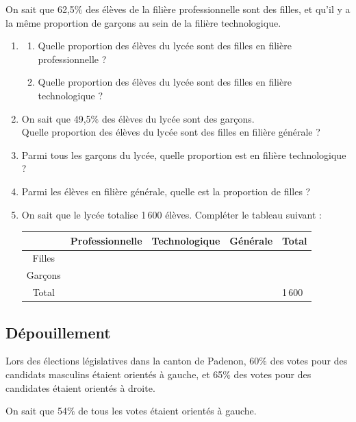 \documentclass[oneside,12pt]{article}          %
\begin{document}
On sait que 62,5$\%$ des élèves de la filière professionnelle sont des filles, et qu'il y a la même proportion de garçons au sein de la filière technologique.
\begin{enumerate}
    \item \begin{enumerate}
        \item Quelle proportion des élèves du lycée sont des filles en filière professionnelle ?
        \item Quelle proportion des élèves du lycée sont des filles en filière technologique ?
    \end{enumerate}
    \item On sait que 49,5$\%$ des élèves du lycée sont des garçons.\\
    Quelle proportion des élèves du lycée sont des filles en filière générale ?
    \item Parmi tous les garçons du lycée, quelle proportion est en filière technologique ?
    \item Parmi les élèves en filière générale, quelle est la proportion de filles ?
    \item On sait que le lycée totalise 1\,600 élèves. Compléter le tableau suivant :

    \renewcommand{\arraystretch}{1.5}
    \begin{tabular}{| c ||  P{35mm} | P{35mm} | P{35mm} | P{25mm} |} \hline
         & Professionnelle & Technologique & Générale & Total \\ \hline \hline
        Filles & & & & \\ \hline
        Garçons & & & & \\ \hline
        Total & & & & 1\,600 \\ \hline
    \end{tabular}
\end{enumerate}



\subsection{Dépouillement}
Lors des élections législatives dans la canton de Padenon, 60$\%$ des votes pour des candidats masculins étaient orientés à gauche, et 65$\%$ des votes pour des candidates étaient orientés à droite.

On sait que 54$\%$ de tous les votes étaient orientés à gauche.
\end{document}
